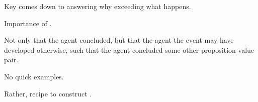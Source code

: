 \begin{note}
  Key comes down to answering why exceeding what happens.

  Importance of \fc{}.

  Not only that the agent concluded, but that the agent the event may have developed otherwise, such that the agent concluded some other proposition-value pair.
\end{note}

\begin{note}
  No quick examples.

  Rather, recipe to construct .
\end{note}













